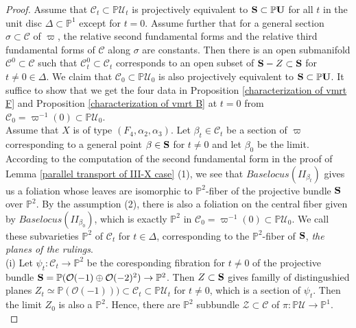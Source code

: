 \documentclass[12pt]{amsart}
\theoremstyle{plain}
\theoremstyle{definition}
\begin{document}
\begin{proof} Assume that $\mathcal C_t \subset \mathbb P \mathcal  U_t$ is projectively equivalent to ${\bf S} \subset \mathbb P {\bf U}$ for all $t  $ in the unit disc $\Delta \subset \mathbb P^1$ except  for $t=0$. Assume further  that for  a general  section $\sigma \subset \mathcal C$ of $\varpi$, the relative second fundamental forms and the relative third fundamental forms of $\mathcal C$ along $\sigma$ are constants. Then there is an open submanifold $\mathcal C^0\subset \mathcal C$ such that $\mathcal C_t^0 \subset \mathcal C_t $ corresponds to an open subset of ${\bf S} -Z \subset {\bf S}$ for $t \not=0  \in \Delta $.   We claim that $\mathcal C_0 \subset \mathbb P \mathcal U_0$ is also projectively equivalent to ${\bf S} \subset \mathbb P {\bf U}$.
%
It suffice to show that we   get   the four data in Proposition \ref{characterization of vmrt F} and Proposition \ref{characterization of vmrt B} at $t=0$ from $\mathcal C_0=\varpi^{-1}(0) \subset \mathbb P \mathcal  U_0$.
\\

Assume that $X$ is of type $(F_4, \alpha_2, \alpha_3)$.
Let $\beta_t \in \mathcal C_t$  be a section of $\varpi$ corresponding to a general point $\beta \in {\bf S}$ for $t\neq 0$ and let $\beta_0$ be the limit. According to the computation of the second fundamental form in the proof of  Lemma  \ref{parallel transport of III-X case} (1), we see that $Baselocus(II_{\beta_t})$ gives us a foliation whose leaves are isomorphic to $\mathbb P^2$-fiber of the projective bundle ${\bf S}$ over $\mathbb P^2$. By the assumption (2), there is also a foliation on the central fiber given by $Baselocus(II_{\beta_0})$, which is exactly $\mathbb P^2$ in $\mathcal C_0=\varpi^{-1}(0) \subset \mathbb P \mathcal  U_0$. We call these subvarieties $\mathbb P^2$ of $\mathcal C_t$ for $t \in \Delta$, corresponding to the $\mathbb P^2$-fiber of  ${\bf S}$, \emph{the planes of the rulings}. \\

(i) Let $\psi_t \colon \mathcal C_t  \rightarrow \mathbb P^2$ be the coresponding fibration for $t \neq 0$ of the projective bundle ${\bf S}=\mathbb P(\mathcal O(-1) \oplus \mathcal O(-2)^2) \rightarrow \mathbb P^2$. Then $Z \subset {\bf S}$ gives familly of distingushied planes $Z_t \simeq \mathbb P(\mathcal O(-1))) \subset \mathcal C_t \subset \mathbb P  \mathcal U_t$ for $t\neq 0$, which is a section of $\psi_t$. Then the limit $Z_0$ is also a $\mathbb P^2$. Hence, there are $\mathbb P^2$ subbundle  $\mathcal Z \subset \mathcal C$ of $\pi: \mathbb P \mathcal U\rightarrow \mathbb P^1$. \\


\end{proof}
\end{document}
